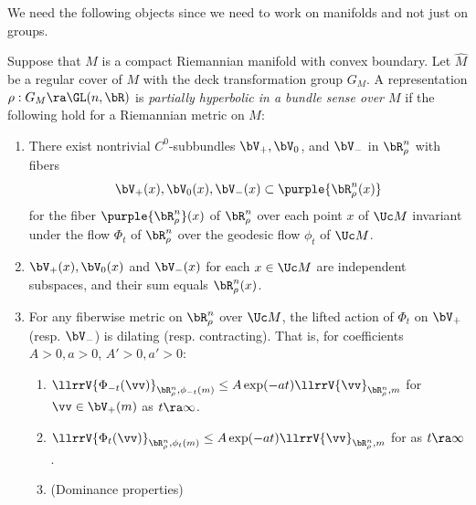 We need the following objects
since we need to work on manifolds and not just on groups. 
\begin{definition}\label{defn:phyp} 
	Suppose that $M$ is a compact Riemannian manifold with convex boundary.
	Let $\hat{M}$ be a regular cover of $M$ with the deck transformation group $G_M$.
	A representation $\rho: G_M \ra \GL(n, \bR)$ is {\em partially hyperbolic in a bundle sense 
over $M$} if 
	the following hold for a Riemannian metric on $M$: 
	\begin{enumerate} 
		\item[(i)] 
		There exist nontrivial $C^0$-subbundles $\bV_+, \bV_0$, and $\bV_-$ in $\bR^n_{\rho}$ 
		with fibers \[\bV_+(x), \bV_0(x), \bV_-(x) \subset \purple{\bR^n_{\rho}(x)}\] for the fiber $\purple{\bR^n_{\rho}}(x)$ of $\bR^n_{\rho}$ over each point $x$ of $\Uc M$
		invariant under the flow $\Phi_t$ of $\bR^n_{\rho}$ over 
		the geodesic flow $\phi_t$ of $\Uc M$. 
		\item[(ii)] $\bV_+(x), \bV_0(x)$ and $\bV_-(x) $ for 
		each $x \in \Uc M$ are independent subspaces, and their sum equals $\bR^n_{\rho}(x)$.
		\item[(iii)] For any fiberwise metric on $\bR^n_{\rho}$ over $\Uc M$, 
		the lifted action of $\Phi_{t}$ on $\bV_{+}$ (resp. $\bV_{-}$) is dilating (resp. contracting). 
		That is, for coefficients $A> 0, a> 0$, $A' > 0, a'>0$\/: 
		\begin{enumerate} 
			\item $\llrrV{\Phi_{-t}(\vv)}_{\bR^n_\rho, \phi_{-t}(m)} \leq 
A \exp(-a t)\llrrV{\vv}_{\bR^n_\rho, m}$ for $\vv \in \bV_+(m)$ as $t \ra \infty$. 
			\item $\llrrV{\Phi_{t}(\vv)}_{\bR^n_\rho, {\phi_{t}(m)}} \leq 
A \exp(-a t)\llrrV{\vv}_{\bR^n_\rho, m}$ for  as $t \ra \infty$. 
			\item (Dominance properties) 
			\begin{multline} \label{eqn:dominance} 

\end{multline}
\end{enumerate}
\end{enumerate}
\end{definition}
